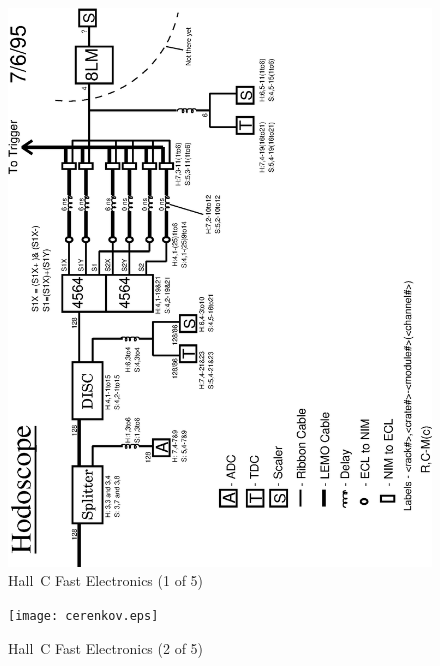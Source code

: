 \begin{figure}
\includegraphics[width=5.8in]{hodoscope.eps}
\caption{Hall~C Fast Electronics (1 of 5) \label{fig:7.2}}
\end{figure}
\clearpage

\begin{figure}
\texttt{[image: cerenkov.eps]}
\caption{Hall~C Fast Electronics (2 of 5) \label{fig:7.3}}
\end{figure}
\clearpage

